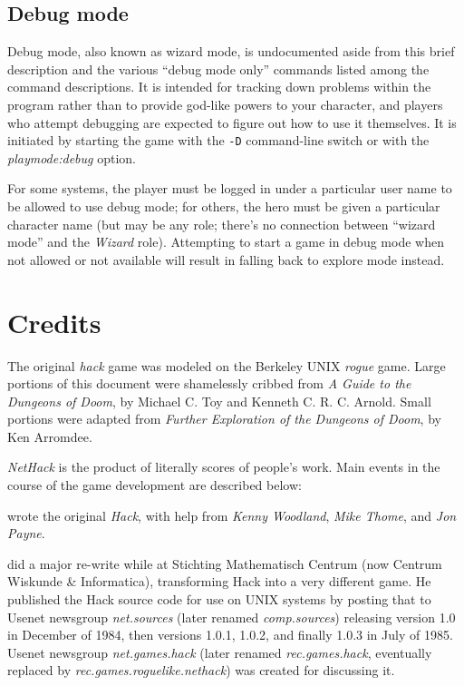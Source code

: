 \subsection*{Debug mode}

Debug mode, also known as wizard mode, is undocumented aside from this
brief description and the various ``debug mode only'' commands listed
among the command descriptions.
It is intended for tracking down problems within the
program rather than to provide god-like powers to your character, and
players who attempt debugging are expected to figure out how to use it
themselves.
It is initiated by starting the game with the
{\tt -D}
command-line switch or with the
{\it playmode:debug\/}
option.

For some systems, the player must be logged in
under a particular user name to be allowed to use debug mode; for others,
the hero must be given a particular character name (but may be any role;
there's no connection between ``wizard mode'' and the {\it Wizard\/} role).
Attempting to start a game in debug mode when not allowed
or not available will result in falling back to explore mode instead.

\section{Credits}
The original %
{\it hack\/} game was modeled on the Berkeley
UNIX
{\it rogue\/} game.  Large portions of this document were shamelessly
cribbed from %
{\it A Guide to the Dungeons of Doom}, by Michael C. Toy
and Kenneth C. R. C. Arnold.  Small portions were adapted from
{\it Further Exploration of the Dungeons of Doom}, by Ken Arromdee.

{\it NetHack\/} is the product of literally scores of people's work.
Main events in the course of the game development are described below:

\bigskip
{} wrote the original {\it Hack}, with help from {\it
Kenny Woodland}, {\it Mike Thome}, and {\it Jon Payne}.

\medskip
{} did a major re-write while at
Stichting Mathematisch Centrum (now Centrum Wiskunde \& Informatica),
transforming Hack into a very different game.
He published the Hack source code for use on UNIX
systems by posting that to Usenet
newsgroup {\it net.sources\/} (later renamed {\it comp.sources})
releasing version 1.0 in December of 1984, then versions 1.0.1, 1.0.2,
and finally 1.0.3 in July of 1985.
Usenet newsgroup {\it net.games.hack\/} (later
renamed {\it rec.games.hack}, eventually replaced
by {\it rec.games.roguelike.nethack})
was created for discussing it.


